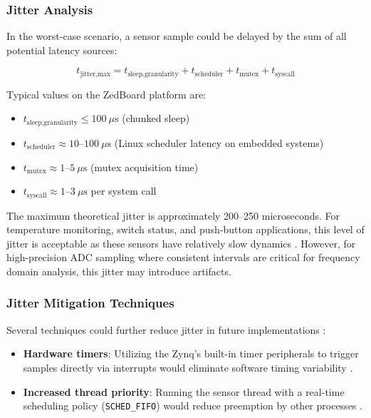 \subsubsection{Jitter Analysis}

In the worst-case scenario, a sensor sample could be delayed by the sum of all potential latency sources:

\[
t_{\text{jitter,max}} = t_{\text{sleep,granularity}} + t_{\text{scheduler}} + t_{\text{mutex}} + t_{\text{syscall}}
\]

Typical values on the ZedBoard platform are:
\begin{itemize}
    \item $t_{\text{sleep,granularity}} \leq 100\ \mu\text{s}$ (chunked sleep)
    \item $t_{\text{scheduler}} \approx 10\text{--}100\ \mu\text{s}$ (Linux scheduler latency on embedded systems) \cite{realtime}
    \item $t_{\text{mutex}} \approx 1\text{--}5\ \mu\text{s}$ (mutex acquisition time)
    \item $t_{\text{syscall}} \approx 1\text{--}3\ \mu\text{s}$ per system call
\end{itemize}

The maximum theoretical jitter is approximately 200--250 microseconds. For temperature monitoring, switch status, and push-button applications, this level of jitter is acceptable as these sensors have relatively slow dynamics \cite{maxim31865, max31865datasheet}. However, for high-precision ADC sampling where consistent intervals are critical for frequency domain analysis, this jitter may introduce artifacts.

\subsubsection{Jitter Mitigation Techniques}

Several techniques could further reduce jitter in future implementations \cite{amd-embedded, realtime}:

\begin{itemize}
    \item \textbf{Hardware timers}: Utilizing the Zynq's built-in timer peripherals to trigger samples directly via interrupts would eliminate software timing variability \cite{amd-ug1085}.
    \item \textbf{Increased thread priority}: Running the sensor thread with a real-time scheduling policy (\texttt{SCHED\_FIFO}) would reduce preemption by other processes \cite{llnl-pthreads, posix-standard}.
\end{itemize}

